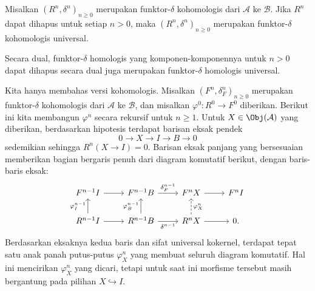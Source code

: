 \begin{proposisi}\label{prop:erasable-univ-delta}
	Misalkan $(R^n, \delta^n)_{n \geq 0}$ merupakan funktor-$\delta$ kohomologis dari $\mathcal{A}$ ke $\mathcal{B}$. Jika $R^n$ dapat dihapus untuk setiap $n > 0$, maka $(R^n, \delta^n)_{n \geq 0}$ merupakan funktor-$\delta$ kohomologis universal.
	
	Secara dual, funktor-$\delta$ homologis yang komponen-komponennya untuk $n > 0$ dapat dihapus secara dual juga merupakan funktor-$\delta$ homologis universal.
\end{proposisi}
\begin{bukti}
	Kita hanya membahas versi kohomologis. Misalkan $(F^n, \delta_F^n)_{n \geq 0}$ merupakan funktor-$\delta$ kohomologis dari $\mathcal{A}$ ke $\mathcal{B}$, dan misalkan $\varphi^0: R^0 \to F^0$ diberikan. Berikut ini kita membangun $\varphi^n$ secara rekursif untuk $n \geq 1$. Untuk $X \in \Obj(\mathcal{A})$ yang diberikan, berdasarkan hipotesis terdapat barisan eksak pendek
	\[ 0 \to X \to I \to B \to 0 \]
	sedemikian sehingga $R^n(X \to I) = 0$. Barisan eksak panjang yang bersesuaian memberikan bagian bergaris penuh dari diagram komutatif berikut, dengan baris-baris eksak:
	\[\begin{tikzcd}
		F^{n-1} I \arrow[r] & F^{n-1} B \arrow[r, "{\delta_F^{n-1}}"] & F^n X \arrow[r] & F^n I \\
		R^{n-1} I \arrow[u, "{\varphi^{n-1}_I}"] \arrow[r] & R^{n-1} B \arrow[u, "{\varphi^{n-1}_B}"] \arrow[r, "{\delta^{n-1}}"'] & R^n X \arrow[dashed, u, "{\varphi^n_X}"'] \arrow[r] & 0 .
	\end{tikzcd}\]
	Berdasarkan eksaknya kedua baris dan sifat universal kokernel, terdapat tepat satu anak panah putus-putus $\varphi^n_X$ yang membuat seluruh diagram komutatif. Hal ini mencirikan $\varphi^n_X$ yang dicari, tetapi untuk saat ini morfisme tersebut masih bergantung pada pilihan $X \hookrightarrow I$.
	

\end{bukti}

